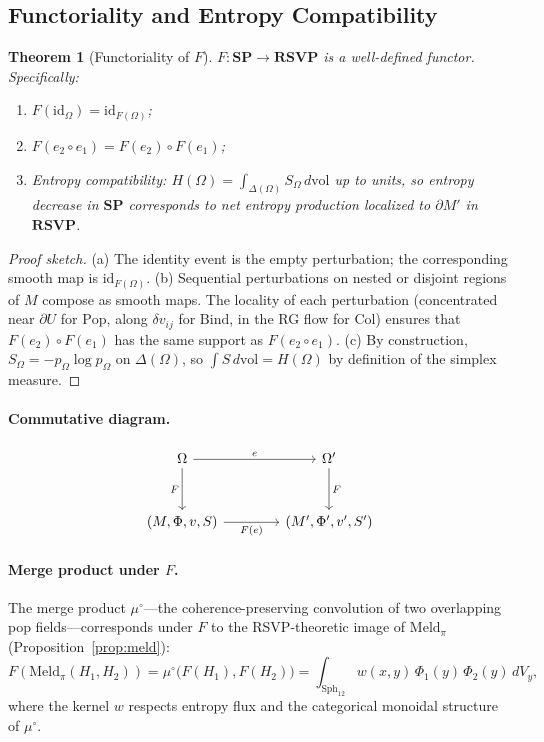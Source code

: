 \documentclass[12pt, a4paper]{article}
\newtheorem{theorem}{Theorem}[section]
\theoremstyle{definition}
\theoremstyle{remark}
\newcommand{\Ent}{H}
\newcommand{\SP}{\mathbf{SP}}
\newcommand{\RSVP}{\mathbf{RSVP}}
\newcommand{\Pop}{\mathrm{Pop}}
\newcommand{\Bind}{\mathrm{Bind}}
\newcommand{\Collapse}{\mathrm{Col}}
\newcommand{\Meld}{\mathrm{Meld}}
\newcommand{\id}{\mathrm{id}}
\begin{document}
\subsection{Functoriality and Entropy Compatibility}

\begin{theorem}[Functoriality of $F$]
\label{thm:functor}
$F : \SP \to \RSVP$ is a well-defined functor. Specifically:
\begin{enumerate}[label=(\alph*)]
  \item $F(\id_\Omega) = \id_{F(\Omega)}$;
  \item $F(e_2 \circ e_1) = F(e_2) \circ F(e_1)$;
  \item Entropy compatibility: $\Ent(\Omega) = \int_{\Delta(\Omega)} S_\Omega\,d\mathrm{vol}$
        up to units, so entropy decrease in $\SP$ corresponds to net entropy production
        localized to $\partial M'$ in $\RSVP$.
\end{enumerate}
\end{theorem}

\begin{proof}[Proof sketch]
(a) The identity event is the empty perturbation; the corresponding smooth map is
$\id_{F(\Omega)}$. (b) Sequential perturbations on nested or disjoint regions of $M$
compose as smooth maps. The locality of each perturbation (concentrated near $\partial
U$ for $\Pop$, along $\delta v_{ij}$ for $\Bind$, in the RG flow for $\Collapse$)
ensures that $F(e_2) \circ F(e_1)$ has the same support as $F(e_2 \circ e_1)$.
(c) By construction, $S_\Omega = -p_\Omega \log p_\Omega$ on $\Delta(\Omega)$,
so $\int S\,d\mathrm{vol} = \Ent(\Omega)$ by definition of the simplex measure.
\end{proof}

\paragraph{Commutative diagram.}
\[
\begin{tikzcd}[column sep=4em, row sep=3em]
  \Omega
  \arrow[r, "e"]
  \arrow[d, "F"']
  &
  \Omega'
  \arrow[d, "F"]
  \\
  (M,\Phi,v,S)
  \arrow[r, "F(e)"']
  &
  (M',\Phi',v',S')
\end{tikzcd}
\]

\paragraph{Merge product under $F$.}
The merge product $\mu^\circ$—the
coherence-preserving convolution of two overlapping pop fields—corresponds under $F$
to the RSVP-theoretic image of $\Meld_\pi$ (Proposition~\ref{prop:meld}):
\[
  F(\Meld_\pi(H_1, H_2)) = \mu^\circ\bigl(F(H_1), F(H_2)\bigr)
  = \int_{\mathrm{Sph}_{12}} w(x,y)\,\Phi_1(y)\,\Phi_2(y)\,dV_y,
\]
where the kernel $w$ respects entropy flux and the categorical monoidal structure
of $\mu^\circ$.
\end{document}
